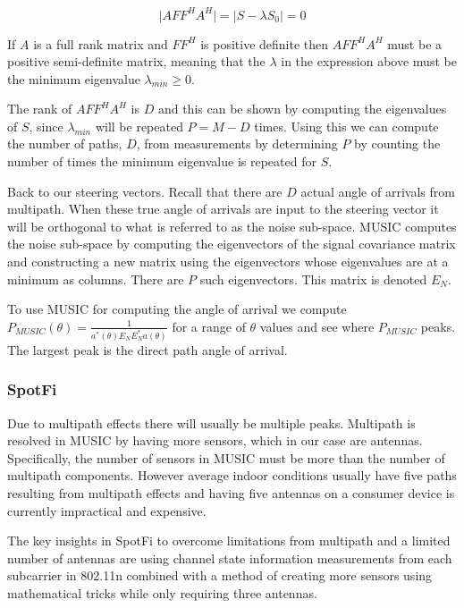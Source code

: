 \documentclass[12pt]{report}
\begin{document}
$$\lvert A FF^{H} A^{H} \rvert = \lvert S - \lambda S_{0} \rvert = 0$$

If $A$ is a full rank matrix and $FF^{H}$ is positive definite then $A FF^{H} A^{H}$ must be a positive semi-definite matrix, meaning that the $\lambda$ in the expression above must be the minimum eigenvalue $\lambda_{min} \geq 0$. \par

The rank of $A FF^{H} A^{H}$ is $D$ and this can be shown by computing the eigenvalues of $S$, since $\lambda_{min}$ will be repeated $P = M - D$ times. Using this we can compute the number of paths, $D$, from measurements by determining $P$ by counting the number of times the minimum eigenvalue is repeated for $S$. \par

Back to our steering vectors. Recall that there are $D$ actual angle of arrivals from multipath. When these true angle of arrivals are input to the steering vector it will be orthogonal to what is referred to as the noise sub-space. MUSIC computes the noise sub-space by computing the eigenvectors of the signal covariance matrix and constructing a new matrix using the eigenvectors whose eigenvalues are at a minimum as columns. There are $P$ such eigenvectors. This matrix is denoted $E_{N}$. \par

To use MUSIC for computing the angle of arrival we compute $P_{MUSIC}(\theta) = \frac{1}{a^{*}(\theta) E_{N} E_{N}^{*} a(\theta)}$ for a range of $\theta$ values and see where $P_{MUSIC}$ peaks. The largest peak is the direct path angle of arrival. \par

\subsubsection{SpotFi}
Due to multipath effects there will usually be multiple peaks. Multipath is resolved in MUSIC by having more sensors, which in our case are antennas. Specifically, the number of sensors in MUSIC must be more than the number of multipath components. However average indoor conditions usually have five paths resulting from multipath effects and having five antennas on a consumer device is currently impractical and expensive. \par

The key insights in SpotFi to overcome limitations from multipath and a limited number of antennas are using channel state information measurements from each subcarrier in 802.11n combined with a method of creating more sensors using mathematical tricks while only requiring three antennas. \par
\end{document}
